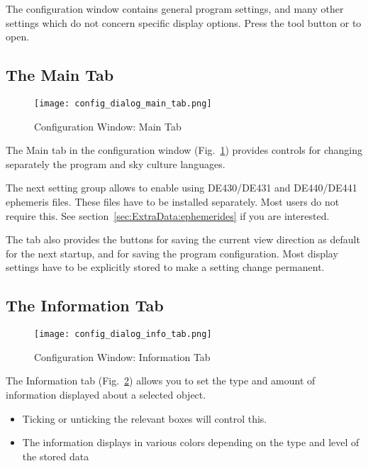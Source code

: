 The configuration window contains general program settings, and many
other settings which do not concern specific display options. Press
the tool button  or  to open.


\subsection{The Main Tab}
\label{sec:gui:configuration:main}


\begin{figure}[htbp]
\centering\texttt{[image: config\_dialog\_main\_tab.png]}
\caption{Configuration Window: Main Tab}
\label{fig:gui:configuration:main}
\end{figure}

The Main tab in the configuration window (Fig.~\ref{fig:gui:configuration:main}) provides controls for
changing separately the program and sky culture languages.

The next setting group allows to enable using DE430/DE431 and DE440/DE441 ephemeris files. 
These files have to be installed separately. Most users do not require this. 
See section~\ref{sec:ExtraData:ephemerides} if you are interested.

The tab also provides the buttons for saving the current view direction as default 
for the next startup, and for saving the program configuration. 
Most display settings have to be explicitly stored to make a setting change permanent.

\subsection{The Information Tab}
\label{sec:gui:configuration:info}

\begin{figure}[htbp]
\centering\texttt{[image: config\_dialog\_info\_tab.png]}
\caption{Configuration Window: Information Tab}
\label{fig:gui:configuration:info}
\end{figure}

The Information tab (Fig.~\ref{fig:gui:configuration:info}) allows you to set the type and amount of information
displayed about a selected object.
\begin{itemize}
\item Ticking or unticking the relevant boxes will control this.
\item The information displays in various colors depending on the type and
level of the stored data
\end{itemize}

